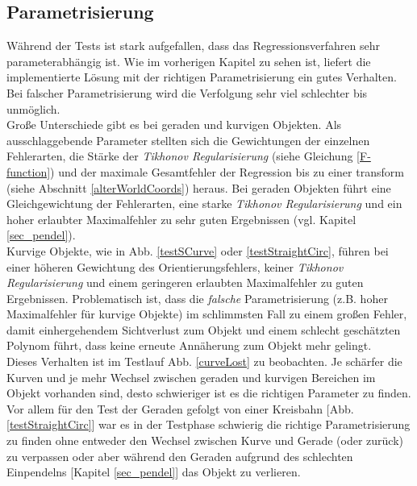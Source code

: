 \subsection{Parametrisierung}
\label{sec_param}
Während der Tests ist stark aufgefallen, dass das Regressionsverfahren sehr parameterabhängig ist. Wie im vorherigen Kapitel zu sehen ist, liefert die implementierte Lösung mit der richtigen Parametrisierung ein gutes Verhalten. 
Bei falscher Parametrisierung wird die Verfolgung sehr viel schlechter bis unmöglich.\\
Große Unterschiede gibt es bei geraden und kurvigen Objekten. Als ausschlaggebende Parameter stellten sich die Gewichtungen der einzelnen Fehlerarten, die Stärke der \textit{Tikhonov Regularisierung} (siehe Gleichung \ref{F-function}) und der maximale Gesamtfehler der Regression bis zu einer \gls{transform} (siehe Abschnitt \ref{alterWorldCoords}) heraus.
Bei geraden Objekten führt eine Gleichgewichtung der Fehlerarten, eine starke \textit{Tikhonov Regularisierung} und ein hoher erlaubter Maximalfehler zu sehr guten Ergebnissen (vgl. Kapitel \ref{sec_pendel}).\\
Kurvige Objekte, wie in Abb. \ref{testSCurve} oder \ref{testStraightCirc}, führen bei einer höheren Gewichtung des Orientierungsfehlers, keiner \textit{Tikhonov Regularisierung} und einem geringeren erlaubten Maximalfehler zu guten Ergebnissen.
Problematisch ist, dass die \textit{falsche} Parametrisierung (z.B. hoher Maximalfehler für kurvige Objekte) im schlimmsten Fall zu einem großen Fehler, damit einhergehendem Sichtverlust zum Objekt und einem schlecht geschätzten Polynom führt, dass keine erneute Annäherung zum Objekt mehr gelingt. \\
Dieses Verhalten ist im Testlauf Abb. \ref{curveLost} zu beobachten. Je schärfer die Kurven und je mehr Wechsel zwischen geraden und kurvigen Bereichen im Objekt vorhanden sind, desto schwieriger ist es die richtigen Parameter zu finden. Vor allem für den Test der Geraden gefolgt von einer Kreisbahn [Abb. \ref{testStraightCirc}] war es in der Testphase schwierig die richtige Parametrisierung zu finden ohne entweder den Wechsel zwischen Kurve und Gerade (oder zurück) zu verpassen oder aber während den Geraden aufgrund des schlechten Einpendelns [Kapitel \ref{sec_pendel}] das Objekt zu verlieren.

